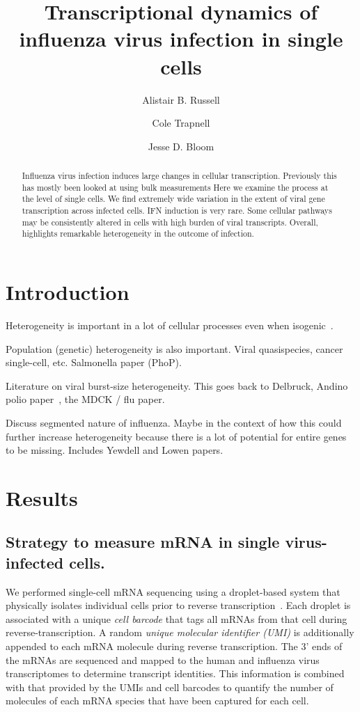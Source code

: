 \documentclass[9pt,lineno]{elife}
\title{Transcriptional dynamics of influenza virus infection in single cells}
\author[1]{Alistair B. Russell}
\author[2]{Cole Trapnell}
\author[1,2*]{Jesse D. Bloom}
\affil[1]{Basic Sciences Division and Computational Biology Program, Fred Hutchinson Cancer Research Center, Seattle, United States}
\affil[2]{Department of Genome Sciences, University of Washington, Seattle, United States}
\begin{document}
\maketitle

\begin{abstract}
Influenza virus infection induces large changes in cellular transcription.
Previously this has mostly been looked at using bulk measurements
Here we examine the process at the level of single cells.
We find extremely wide variation in the extent of viral gene transcription across infected cells.
IFN induction is very rare.
Some cellular pathways may be consistently altered in cells with high burden of viral transcripts.
Overall, highlights remarkable heterogeneity in the outcome of infection.
\end{abstract}


\section{Introduction}

Heterogeneity is important in a lot of cellular processes even when isogenic~\citep{Shalek:2014ey,Shalek:2013ej}.

Population (genetic) heterogeneity is also important. 
Viral quasispecies, cancer single-cell, etc.
Salmonella paper (PhoP).

Literature on viral burst-size heterogeneity.
This goes back to Delbruck, Andino polio paper~\citep{Schulte:2014br}, the MDCK / flu paper.

Discuss segmented nature of influenza.
Maybe in the context of how this could further increase heterogeneity because there is a lot of potential for entire genes to be missing.
Includes Yewdell and Lowen papers.

\section{Results}

\subsection{Strategy to measure mRNA in single virus-infected cells.}
We performed single-cell mRNA sequencing using a droplet-based system that physically isolates individual cells prior to reverse transcription~\citep{zheng2017massively,Macosko:2015ht,Klein:2015ki}.
Each droplet is associated with a unique \emph{cell barcode} that tags all mRNAs from that cell during reverse-transcription.
A random \emph{unique molecular identifier (UMI)} is additionally appended to each mRNA molecule during reverse transcription.
The 3' ends of the mRNAs are sequenced and mapped to the human and influenza virus transcriptomes to determine transcript identities.
This information is combined with that provided by the UMIs and cell barcodes to quantify the number of molecules of each mRNA species that have been captured for each cell.
\end{document}
